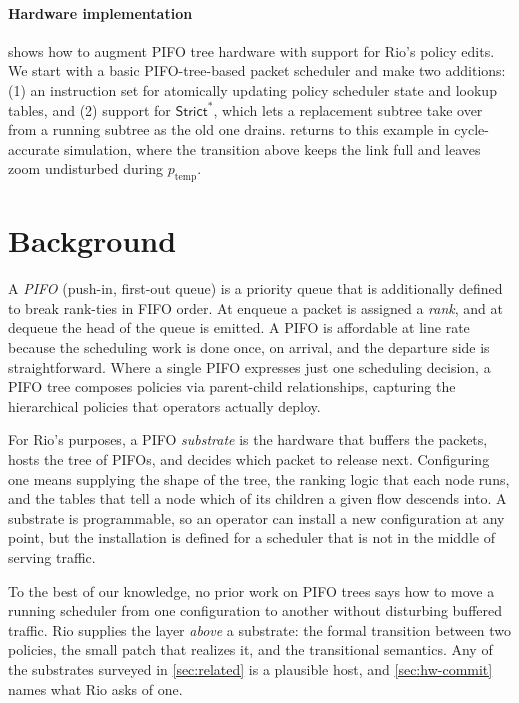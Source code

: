 \documentclass[sigplan,anonymous,review,nonacm]{acmart}
\newcommand{\Strictstar}{\textsf{Strict}^{*}}
\begin{document}
\paragraph{Hardware implementation}
 shows how to augment PIFO tree hardware with support for Rio's policy edits.
We start with a basic PIFO-tree-based packet scheduler and make two additions:
(1) an instruction set for atomically updating policy scheduler state and lookup tables,
and (2) support for $\Strictstar$, which lets a replacement subtree take over from a running subtree as the old one drains.
 returns to this example in cycle-accurate simulation, where the transition above keeps the link full and leaves \textsf{zoom} undisturbed during \(p_\text{temp}\).

\section{Background}\label{sec:background}

A \emph{PIFO} (push-in, first-out queue) is a priority queue that is additionally defined to break rank-ties in FIFO order.
At enqueue a packet is assigned a \emph{rank}, and at dequeue the head of the queue is emitted.
A PIFO is affordable at line rate because the scheduling work is done once, on arrival, and the departure side is straightforward.
Where a single PIFO expresses just one scheduling decision, a PIFO tree composes policies via parent-child relationships, capturing the hierarchical policies that operators actually deploy.

For Rio's purposes, a PIFO \emph{substrate} is the hardware that buffers the packets, hosts the tree of PIFOs, and decides which packet to release next.
Configuring one means supplying the shape of the tree, the ranking logic that each node runs, and the tables that tell a node which of its children a given flow descends into.
A substrate is programmable, so an operator can install a new configuration at any point, but the installation is defined for a scheduler that is not in the middle of serving traffic.

To the best of our knowledge, no prior work on PIFO trees says how to move a running scheduler from one configuration to another without disturbing buffered traffic.
%
Rio supplies the layer \emph{above} a substrate: the formal transition between two policies, the small patch that realizes it, and the transitional semantics.
Any of the substrates surveyed in \cref{sec:related} is a plausible host, and \cref{sec:hw-commit} names what Rio asks of one.
\end{document}
